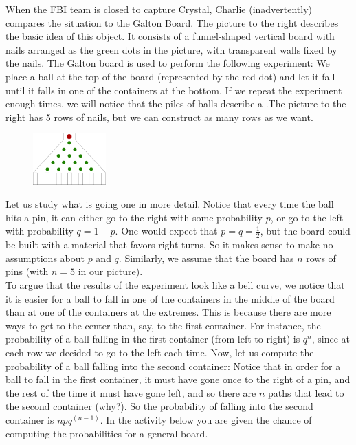 When the FBI team is closed to capture Crystal, Charlie (inadvertently) compares the situation to the Galton Board. The picture to the right describes the basic idea of this object. It consists of a funnel-shaped vertical board with nails arranged as the green dots in the picture, with transparent walls fixed by the nails. The Galton board is used to perform the following experiment: We place a ball at the top of the board (represented by the red dot) and let it fall until it falls in one of the containers at the bottom. If we repeat the experiment enough times, we will notice that the piles of balls describe a .The picture to the right has 5 rows of nails, but we can construct as many rows as we want.
	\begin{figure}[H]
	   \centering
	   \includegraphics[width=0.25\textwidth]{season3/302/images/galton.png} 
	\end{figure}
Let us study what is going one in more detail. Notice that every time the ball hits a pin, it can either go to the right with some probability $p$, or go to the left with probability $q =1 - p$. One would expect that $p = q = \frac{1}{2}$, but the board could be built with a material that favors right turns. So it makes sense to make no assumptions about $p$ and $q$. Similarly, we assume that the board has $n$ rows of pins (with $n = 5$ in our picture). \\

To argue that the results of the experiment look like a bell curve, we notice that it is easier for a ball to fall in one of the containers in the middle of the board than at one of the containers at the extremes. This is because there are more ways to get to the center than, say, to the first container. For instance, the probability of a ball falling in the first container (from left to right) is $q^n$, since at each row we decided to go to the left each time. Now, let us compute the probability of a ball falling into the second container: Notice that in order for a ball to fall in the first container, it must have gone once to the right of a pin, and the rest of the time it must have gone left, and so there are $n$ paths that lead to the second container (why?). So the probability of falling into the second container is $npq^(n-1)$. In the activity below you are given the chance of computing the probabilities for a general board.


